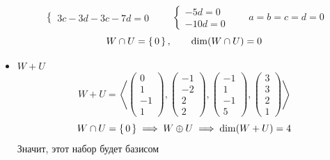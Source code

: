 \begin{itemize}
$$\begin{cases}
        3c - 3d - 3c - 7d = 0
    \end{cases} \qquad
    \begin{cases}
    	-5d = 0 \\
        -10d = 0
    \end{cases} \qquad a = b = c = d = 0 $$
    $$ W \cap U = \set{0}, \qquad \dim(W \cap U) = 0 $$
    \item $ W + U $
    $$ W + U = \left\langle
    \begin{pmatrix}
    	0 \\
        1 \\
        -1 \\
        1
    \end{pmatrix},
    \begin{pmatrix}
    	-1 \\
        -2 \\
        2 \\
        2
    \end{pmatrix},
    \begin{pmatrix}
    	-1 \\
        1 \\
        -1 \\
        5
    \end{pmatrix},
    \begin{pmatrix}
    	3 \\
        3 \\
        2 \\
        1
    \end{pmatrix} \right\rangle $$
    $$ W \cap U = \set{0} \implies W \oplus U \implies \dim(W + U) = 4 $$
    Значит, этот набор будет базисом
\end{itemize}
